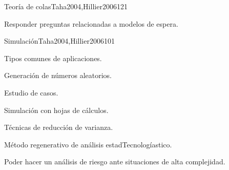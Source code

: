 \begin{syllabus}
\begin{unit}{Teoría de colas}{Taha2004,Hillier2006}{12}{1}
   \begin{unitgoals}
      \item Responder preguntas relacionadas a modelos de espera.
   \end{unitgoals}
\end{unit}

\begin{unit}{Simulación}{Taha2004,Hillier2006}{10}{1}
   \begin{topics}
      \item Tipos comunes de aplicaciones.
      \item Generación de números aleatorios.
      \item Estudio de casos.
      \item Simulación con hojas de cálculos.
      \item Técnicas de reducción de varianza.
      \item Método regenerativo de análisis estadTecnologíastico.
   \end{topics}

   \begin{unitgoals}
      \item Poder hacer un análisis de riesgo ante situaciones de alta complejidad.
   \end{unitgoals}
\end{unit}



\begin{coursebibliography}
\end{coursebibliography}

\end{syllabus}
